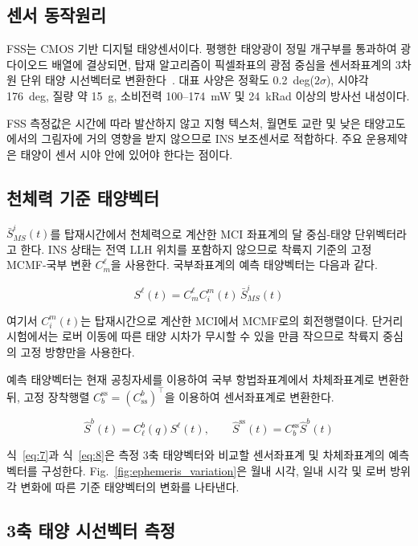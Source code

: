 \documentclass[]{IAC_style}
\begin{document}
\subsection{센서 동작원리}

FSS는 CMOS 기반 디지털 태양센서이다. 평행한 태양광이 정밀 개구부를 통과하여 광다이오드 배열에 결상되면, 탑재 알고리즘이 픽셀좌표의 광점 중심을 센서좌표계의 3차원 단위 태양 시선벡터로 변환한다~\cite{rhee2007satellite}. 대표 사양은 정확도 0.2~deg($2\sigma$), 시야각 176~deg, 질량 약 15~g, 소비전력 100--174~mW 및 24~kRad 이상의 방사선 내성이다.

FSS 측정값은 시간에 따라 발산하지 않고 지형 텍스처, 월면토 교란 및 낮은 태양고도에서의 그림자에 거의 영향을 받지 않으므로 INS 보조센서로 적합하다. 주요 운용제약은 태양이 센서 시야 안에 있어야 한다는 점이다.


\subsection{천체력 기준 태양벡터}

$\bar S_{MS}^i(t)$를 탑재시간에서 천체력으로 계산한 MCI 좌표계의 달 중심-태양 단위벡터라고 한다. INS 상태는 전역 LLH 위치를 포함하지 않으므로 착륙지 기준의 고정 MCMF-국부 변환 $C_m^\ell$을 사용한다. 국부좌표계의 예측 태양벡터는 다음과 같다.

\begin{equation}
\tag{7}\label{eq:7}
S^{\ell}(t)=C_m^\ell C_i^m(t)\,\bar S_{MS}^i(t)
\end{equation}

여기서 $C_i^m(t)$는 탑재시간으로 계산한 MCI에서 MCMF로의 회전행렬이다. 단거리 시험에서는 로버 이동에 따른 태양 시차가 무시할 수 있을 만큼 작으므로 착륙지 중심의 고정 방향만을 사용한다.

예측 태양벡터는 현재 공칭자세를 이용하여 국부 항법좌표계에서 차체좌표계로 변환한 뒤, 고정 장착행렬 $C_b^{\mathrm{ss}}=(C_{\mathrm{ss}}^b)^\top$을 이용하여 센서좌표계로 변환한다.

\begin{equation}
\tag{8}\label{eq:8}
\hat S^b(t)=C_\ell^b(q)S^{\ell}(t),\qquad \hat S^{\mathrm{ss}}(t)=C_b^{\mathrm{ss}}\hat S^b(t)
\end{equation}

식~\eqref{eq:7}과 식~\eqref{eq:8}은 측정 3축 태양벡터와 비교할 센서좌표계 및 차체좌표계의 예측벡터를 구성한다. Fig.~\ref{fig:ephemeris_variation}은 월내 시각, 일내 시각 및 로버 방위각 변화에 따른 기준 태양벡터의 변화를 나타낸다.

\subsection{3축 태양 시선벡터 측정}
\end{document}
